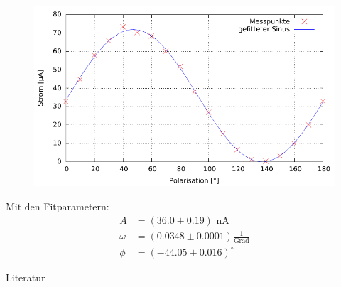 \begin{figure}[htbp]
\includegraphics[scale=1]{../gnu/Polarisation.pdf}
\end{figure}

Mit den Fitparametern:
\begin{align*}
A&=(36.0 \pm 0.19)\text{ nA} \\
\omega&=(0.0348 \pm 0.0001) \frac{1}{\text{Grad}}\\
\phi&=(-44.05 \pm 0.016) ^\circ
\end{align*}


\parskip 340pt
\Large{Literatur}\\\\





